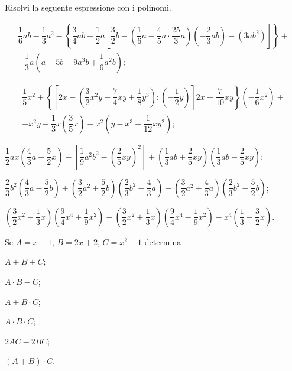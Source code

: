 \begin{esercizio}[\Ast]
\label{ese:11.52} %
Risolvi la seguente espressione con i polinomi.
\begin{enumeratea}
 \item
 \begin{multline*}
 \dfrac{1}{6}ab-\dfrac{1}{3}a^{2}-\left\{\dfrac{3}{4}ab+\dfrac{1}{2}a\left[\dfrac{3}{2}b-\left(\dfrac{1}{6}a-\dfrac{4}{5}a\cdot {\dfrac{25}{3}a}\right)\left(-{\dfrac{2}{3}ab}\right)-\left(3ab^{2}\right)\right]\right\}+\\
 +\dfrac{1}{3}a\left(a-5b-9a^{3}b+\dfrac{1}{6}a^{2}b\right);
 \end{multline*}
 \item
 \begin{multline*}
 \dfrac{1}{5}x^{2}+\left\{\left[2x-\left(\dfrac{3}{2}x^{2}y-\dfrac{7}{4}xy+\dfrac{1}{8}y^{3}\right):\left(-{\dfrac{1}{2}y}\right)\right] 2x-\dfrac{7}{10}xy\right\}\left(-{\dfrac{1}{6}x^{2}}\right)+\\
 +x^{2}y-\dfrac{1}{3}x\left(\dfrac{3}{5}x\right)-x^{2}\left(y-x^{3}-\dfrac{1}{12}xy^{2}\right);
 \end{multline*}
 \item $\dfrac{1}{2}ax\left(\dfrac{4}{3}a+\dfrac{5}{2}x\right)-\left[\dfrac{1}{9}a^{2}b^{2}-\left(\dfrac{2}{5}xy\right)^2\right]+\left(\dfrac{1}{3}ab+\dfrac{2}{5}xy\right)\left(\dfrac{1}{3}ab-\dfrac{2}{5}xy\right)$;
 \item $\dfrac{2}{3}b^{2}\left(\dfrac{4}{3}a-\dfrac{5}{2}b\right)+\left(\dfrac{3}{2}a^{2}+\dfrac{5}{2}b\right)\left(\dfrac{2}{3}b^{2}-\dfrac{4}{3}a\right)-\left(\dfrac{3}{2}a^{2}+\dfrac{4}{3}a\right)\left(\dfrac{2}{3}b^{2}-\dfrac{5}{2}b\right)$;
 \item $\left(\dfrac{3}{2}x^{2}-\dfrac{1}{3}x\right)\left(\dfrac{9}{4}x^{4}+\dfrac{1}{9}x^{2}\right)-\left(\dfrac{3}{2}x^{2}+\dfrac{1}{3}x\right)\left(\dfrac{9}{4}x^{4}-\dfrac{1}{9}x^{2}\right)-x^{4}\left(\dfrac{1}{3}-\dfrac{3}{2}x\right)$.
\end{enumeratea}
\end{esercizio}
\pagebreak
\begin{esercizio}
\label{ese:11.53}
Se $A=x-1$, $B=2x+2$, $C=x^2-1$ determina
\begin{multicols}{3}
\begin{enumeratea}
\item $A+B+C$;
\item $A\cdot B-C$;
\item $A+B\cdot C$;
\item $A\cdot B\cdot C$;
\item $2AC-2BC$;
\item $(A+B)\cdot C$.
\end{enumeratea}
\end{multicols}
\end{esercizio}

